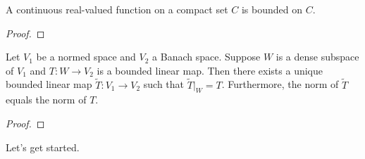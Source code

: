 \begin{theorem}
    \label{thrm:boundedness-theorem}
    \leanok
    A continuous real-valued function on a compact set $C$ is bounded on $C$.
\end{theorem}
\begin{proof}
\leanok
\end{proof}

\begin{theorem}
    \label{thrm:bounded-linear-transformation-theorem}
    \leanok
    Let $V_1$ be a normed space and $V_2$ a Banach space. Suppose $W$ is a dense subspace of $V_1$ and $T: W \rightarrow V_2$ is a bounded linear map. Then there exists a unique bounded linear map $\widetilde{T}: V_1 \rightarrow V_2$ such that $\widetilde{T}\vert_W = T$. Furthermore, the norm of $\widetilde{T}$ equals the norm of $T$.
\end{theorem}
\begin{proof}
\leanok
\end{proof}

Let's get started.

